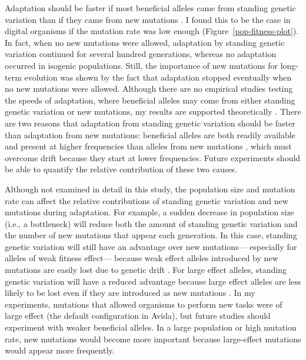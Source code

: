 \begin{doublespace}
Adaptation should be faster if most beneficial alleles
came from standing genetic variation
than if they came from new mutations \citep{bar08}.
%
I found this to be the case in digital organisms
if the mutation rate was low enough (Figure~\ref{pop-fitness-plot}).
%
In fact, when no new mutations were allowed,
adaptation by standing genetic variation continued
for several hundred generations,
whereas no adaptation occurred in isogenic populations.
%
Still, the importance of new mutations
for long-term evolution was shown by the fact
that adaptation stopped eventually
when no new mutations were allowed.
%
Although there are no empirical studies
testing the speeds of adaptation,
where beneficial alleles may come from
either standing genetic variation or new mutations,
my results are supported theoretically \citep{her05}.
%
There are two reasons that adaptation
from standing genetic variation should be faster
than adaptation from new mutations:
beneficial alleles are both readily available
and present at higher frequencies than alleles
from new mutations \citep{bar08},
which must overcome drift because they start at lower frequencies.
%
Future experiments should be able to quantify
the relative contribution of these two causes.



Although not examined in detail in this study,
the population size and mutation rate can affect the relative contributions
of standing genetic variation and new mutations during adaptation.
%
For example, a sudden decrease in population size (i.e., a bottleneck)
will reduce both the amount of standing genetic variation
and the number of new mutations that appear each generation.
%
In this case, standing genetic variation
will still have an advantage over new mutations---%
especially for alleles of weak fitness effect---%
because weak effect alleles introduced by new mutations
are easily lost due to genetic drift \citep{her05}.
%
For large effect alleles,
standing genetic variation will have a reduced advantage
because large effect alleles are less likely to be lost
even if they are introduced as new mutations \citep{her05}.
%
In my experiments, mutations that allowed organisms
to perform new tasks were of large effect
(the default configuration in Avida),
but future studies should experiment with weaker beneficial alleles.
%
In a large population or high mutation rate,
new mutations would become more important
because large-effect mutations would appear more frequently.




\end{doublespace}
